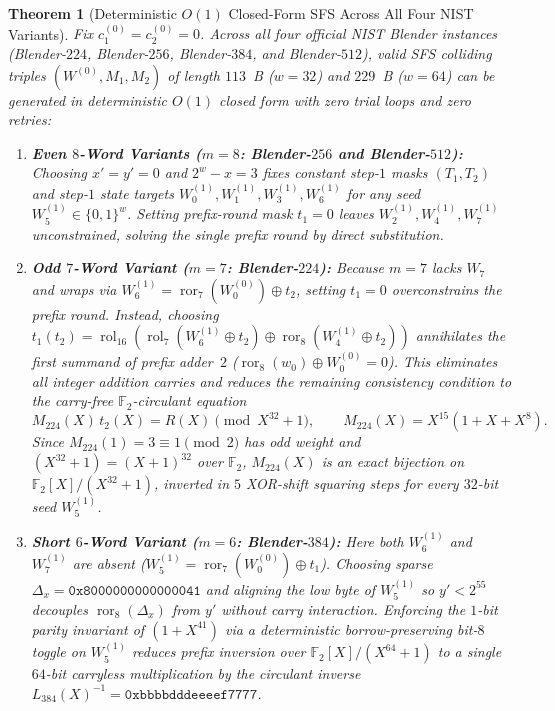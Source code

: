 \documentclass[11pt,a4paper]{article}
\newtheorem{theorem}{Theorem}
\theoremstyle{definition}
\theoremstyle{remark}
\newcommand{\Ftwo}{\mathbb{F}_2}
\newcommand{\ror}{\operatorname{ror}}
\newcommand{\rol}{\operatorname{rol}}
\begin{document}
\begin{theorem}[Deterministic $O(1)$ Closed-Form SFS Across All Four NIST Variants]
\label{thm:sfs-all}
Fix $c_1^{(0)} = c_2^{(0)} = 0$. Across all four official NIST Blender instances (Blender-$224$, Blender-$256$, Blender-$384$, and Blender-$512$), valid SFS colliding triples $(W^{(0)}, M_1, M_2)$ of length $113$~B ($w=32$) and $229$~B ($w=64$) can be generated in deterministic $O(1)$ closed form with zero trial loops and zero retries:
\begin{enumerate}[leftmargin=2em]
    \item \textbf{Even $8$-Word Variants ($m = 8$: Blender-$256$ and Blender-$512$):} Choosing $x' = y' = 0$ and $2^w - x = 3$ fixes constant step-$1$ masks $(T_1, T_2)$ and step-$1$ state targets $W^{(1)}_0, W^{(1)}_1, W^{(1)}_3, W^{(1)}_6$ for any seed $W^{(1)}_5 \in \{0,1\}^w$. Setting prefix-round mask $t_1 = 0$ leaves $W^{(1)}_2, W^{(1)}_4, W^{(1)}_7$ unconstrained, solving the single prefix round by direct substitution.
    \item \textbf{Odd $7$-Word Variant ($m = 7$: Blender-$224$):} Because $m = 7$ lacks $W_7$ and wraps via $W^{(1)}_6 = \ror_7(W^{(0)}_0) \oplus t_2$, setting $t_1 = 0$ overconstrains the prefix round. Instead, choosing $t_1(t_2) = \rol_{16}(\rol_7(W^{(1)}_6 \oplus t_2) \oplus \ror_8(W^{(1)}_4 \oplus t_2))$ annihilates the first summand of prefix adder~$2$ ($\ror_8(w_0) \oplus W^{(0)}_0 = 0$). This eliminates all integer addition carries and reduces the remaining consistency condition to the carry-free $\Ftwo$-circulant equation
    \begin{equation}
        M_{224}(X)\,t_2(X) = R(X) \pmod{X^{32} + 1}, \qquad M_{224}(X) = X^{15}(1 + X + X^8).
        \label{eq:sfs-224}
    \end{equation}
    Since $M_{224}(1) = 3 \equiv 1 \pmod 2$ has odd weight and $(X^{32} + 1) = (X + 1)^{32}$ over $\Ftwo$, $M_{224}(X)$ is an exact bijection on $\Ftwo[X]/(X^{32} + 1)$, inverted in $5$ XOR-shift squaring steps for every $32$-bit seed $W^{(1)}_5$.
    \item \textbf{Short $6$-Word Variant ($m = 6$: Blender-$384$):} Here both $W^{(1)}_6$ and $W^{(1)}_7$ are absent ($W^{(1)}_5 = \ror_7(W^{(0)}_0) \oplus t_1$). Choosing sparse $\Delta_x = \mathtt{0x8000000000000041}$ and aligning the low byte of $W^{(1)}_5$ so $y' < 2^{55}$ decouples $\ror_8(\Delta_x)$ from $y'$ without carry interaction. Enforcing the $1$-bit parity invariant of $(1 + X^{41})$ via a deterministic borrow-preserving bit-$8$ toggle on $W^{(1)}_5$ reduces prefix inversion over $\Ftwo[X]/(X^{64} + 1)$ to a single $64$-bit carryless multiplication by the circulant inverse $L_{384}(X)^{-1} = \mathtt{0xbbbbdddeeeef7777}$.
\end{enumerate}
\end{theorem}
\end{document}
